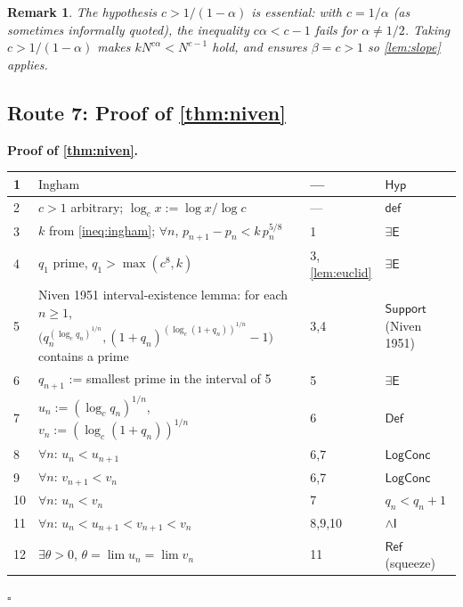 \documentclass[11pt,reqno]{amsart}
\theoremstyle{blueplain}
\newtheorem{remark}{Remark}[section]
\renewcommand{\qedsymbol}{\textcolor{proofqed}{\ensuremath{\square}}}
\renewenvironment{proof}[1][Proof]{\par\noindent\textbf{\textcolor{proofhead}{#1.}}\par\nobreak}{\par\nobreak\hfill\qedsymbol}
\numberwithin{equation}{section}
\begin{document}
\begin{remark}
	{\scriptsize The hypothesis $c>1/(1-\alpha)$ is essential: with $c=1/\alpha$ (as sometimes informally quoted), the inequality $c\alpha<c-1$ fails for $\alpha\neq 1/2$.  Taking $c>1/(1-\alpha)$ makes $k N^{c\alpha}<N^{c-1}$ hold, and ensures $\beta=c>1$ so \cref{lem:slope} applies. }
\end{remark}

\subsection{Route 7: Proof of \cref{thm:niven}}

\begin{proof}[\textbf{Proof of \cref{thm:niven}}]
	\label{proof:niven}
	{\scriptsize
		\begin{tabular}{|m{0.7cm}|m{12cm}|m{1.4cm}|m{2.5cm}|}
			\hline
			1 & $\text{Ingham}$ & --- & $\mathsf{Hyp}$ \\ \hline
			2 & $c>1$ arbitrary; $\log_c x:=\log x/\log c$ & --- & $\mathsf{def}$ \\ \hline
			3 & $k$ from \cref{ineq:ingham}; $\forall n$, $p_{n+1}-p_n<k\,p_n^{5/8}$ & 1 & $\exists\mathsf{E}$ \\ \hline
			4 & $q_1$ prime, $q_1>\max(c^{8},k)$ & 3, \cref{lem:euclid} & $\exists\mathsf{E}$ \\ \hline
			5 & Niven 1951 interval-existence lemma: for each $n\ge 1$, $\bigl(q_n^{(\log_c q_n)^{1/n}},(1+q_n)^{(\log_c(1+q_n))^{1/n}}-1\bigr)$ contains a prime & 3,4 & $\mathsf{Support}$ (Niven 1951) \\ \hline
			6 & $q_{n+1}$ := smallest prime in the interval of 5 & 5 & $\exists\mathsf{E}$ \\ \hline
			7 & $u_n:=(\log_c q_n)^{1/n}$, $v_n:=(\log_c(1+q_n))^{1/n}$ & 6 & $\mathsf{Def}$ \\ \hline
			8 & $\forall n$: $u_n<u_{n+1}$ & 6,7 & $\mathsf{LogConc}$ \\ \hline
			9 & $\forall n$: $v_{n+1}<v_n$ & 6,7 & $\mathsf{LogConc}$ \\ \hline
			10 & $\forall n$: $u_n<v_n$ & 7 & $q_n<q_n+1$ \\ \hline
			11 & $\forall n$: $u_n<u_{n+1}<v_{n+1}<v_n$ & 8,9,10 & $\wedge\mathsf{I}$ \\ \hline
			12 & $\exists\theta>0$, $\theta=\lim u_n=\lim v_n$ & 11 & $\mathsf{Ref}$ (squeeze) \\ \hline

\end{tabular}}
\end{proof}
\end{document}
